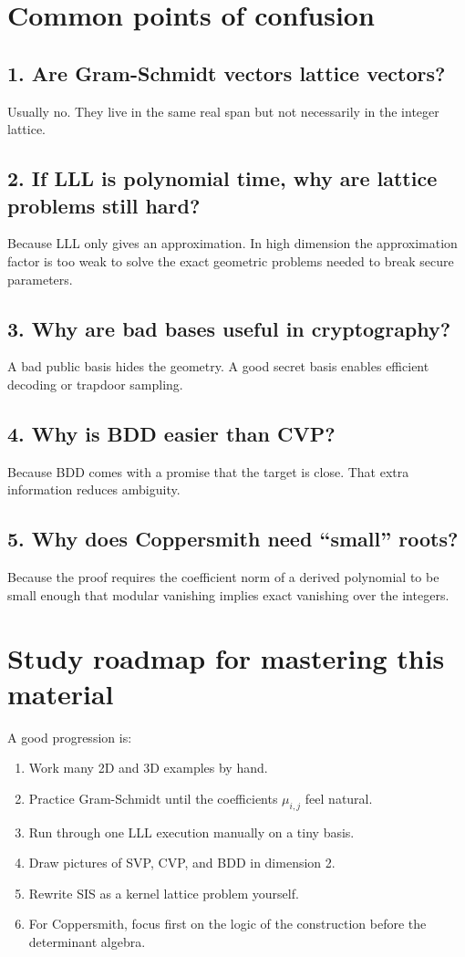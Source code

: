 \documentclass[11pt]{article}
\begin{document}
\section{Common points of confusion}

\subsection*{1. Are Gram-Schmidt vectors lattice vectors?}
Usually no. They live in the same real span but not necessarily in the integer lattice.

\subsection*{2. If LLL is polynomial time, why are lattice problems still hard?}
Because LLL only gives an approximation. In high dimension the approximation factor is too weak to solve the exact geometric problems needed to break secure parameters.

\subsection*{3. Why are bad bases useful in cryptography?}
A bad public basis hides the geometry. A good secret basis enables efficient decoding or trapdoor sampling.

\subsection*{4. Why is BDD easier than CVP?}
Because BDD comes with a promise that the target is close. That extra information reduces ambiguity.

\subsection*{5. Why does Coppersmith need ``small'' roots?}
Because the proof requires the coefficient norm of a derived polynomial to be small enough that modular vanishing implies exact vanishing over the integers.

\section{Study roadmap for mastering this material}

A good progression is:
\begin{enumerate}
    \item Work many 2D and 3D examples by hand.
    \item Practice Gram-Schmidt until the coefficients $\mu_{i,j}$ feel natural.
    \item Run through one LLL execution manually on a tiny basis.
    \item Draw pictures of SVP, CVP, and BDD in dimension 2.
    \item Rewrite SIS as a kernel lattice problem yourself.
    \item For Coppersmith, focus first on the logic of the construction before the determinant algebra.
\end{enumerate}
\end{document}
